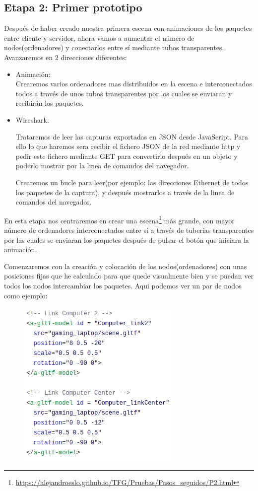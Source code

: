 \documentclass[a4paper, 12pt]{book}
\begin{document}
\subsection{Etapa 2: Primer prototipo}

Después de haber creado nuestra primera escena con animaciones de los paquetes entre cliente y servidor, ahora vamos a aumentar el número de nodos(ordenadores) y conectarlos entre sí mediante tubos transparentes. Avanzaremos en 2 direcciones diferentes:
\begin{itemize}
    \item Animación:
\\
Crearemos varios ordenadores mas distribuidos en la escena e interconectados todos a través 	de unos tubos transparentes por los cuales se enviaran y recibirán los paquetes.

\item Wireshark:

Trataremos de leer las capturas exportadas en JSON desde JavaScript. Para ello lo que 	haremos sera recibir el fichero JSON de la red mediante http y pedir este fichero mediante 	GET para convertirlo después en un objeto y poderlo mostrar por la linea de comandos del 	navegador.

Crearemos un bucle para leer(por ejemplo: las direcciones Ethernet de todos los paquetes de la captura), y después mostrarlos a través de la linea de comandos del navegador.

\end{itemize}

En esta etapa nos centraremos en crear una escena\footnote{\url{https://alejandroeslo.github.io/TFG/Pruebas/Pasos_seguidos/P2.html}} más grande, con mayor número de ordenadores interconectados entre sí a través de tuberías transparentes por las cuales se enviaran los paquetes después de pulsar el botón que iniciara la animación.

Comenzaremos con la creación y colocación de los nodos(ordenadores) con unas posiciones fijas que he calculado para que quede visualmente bien y se puedan ver todos los nodos intercambiar los paquetes. Aqui podemos ver un par de nodos como ejemplo:

\begin{figure}[h]
\centering
    \includegraphics[scale=0.5]{img/paso2_1a.png}
\end{figure}
\end{document}
